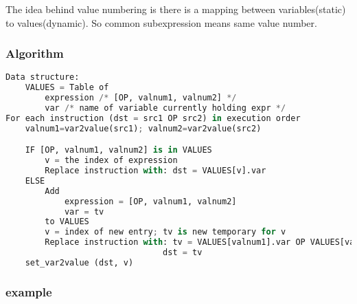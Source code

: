 The idea behind value numbering is there is a mapping between variables(static) to values(dynamic). So common subexpression means same 
value number.

\subsubsection{Algorithm}


\begin{lstlisting}[language=python, caption=code ,label=lst:vna]
Data structure:
    VALUES = Table of
        expression /* [OP, valnum1, valnum2] */
        var /* name of variable currently holding expr */
For each instruction (dst = src1 OP src2) in execution order
    valnum1=var2value(src1); valnum2=var2value(src2)

    IF [OP, valnum1, valnum2] is in VALUES
        v = the index of expression
        Replace instruction with: dst = VALUES[v].var
    ELSE
        Add
            expression = [OP, valnum1, valnum2]
            var = tv
        to VALUES
        v = index of new entry; tv is new temporary for v
        Replace instruction with: tv = VALUES[valnum1].var OP VALUES[valnum2].var
                                dst = tv
    set_var2value (dst, v)  
\end{lstlisting}


\subsubsection{example}






